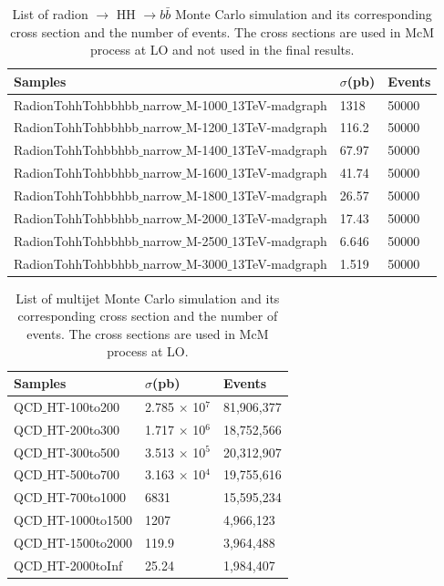 \begin{table}[h!]
  \begin{center}
    \begin{tabular}{l|l|l}
    Samples & $\sigma$(pb) & Events \\
    \hline
    RadionTohhTohbbhbb$\_$narrow$\_$M-1000$\_$13TeV-madgraph & 1318 & 50000 \\
    RadionTohhTohbbhbb$\_$narrow$\_$M-1200$\_$13TeV-madgraph & 116.2 & 50000 \\
    RadionTohhTohbbhbb$\_$narrow$\_$M-1400$\_$13TeV-madgraph & 67.97 & 50000 \\
    RadionTohhTohbbhbb$\_$narrow$\_$M-1600$\_$13TeV-madgraph & 41.74 & 50000 \\
    RadionTohhTohbbhbb$\_$narrow$\_$M-1800$\_$13TeV-madgraph & 26.57 & 50000 \\
    RadionTohhTohbbhbb$\_$narrow$\_$M-2000$\_$13TeV-madgraph & 17.43 & 50000 \\
    RadionTohhTohbbhbb$\_$narrow$\_$M-2500$\_$13TeV-madgraph & 6.646 & 50000 \\
    RadionTohhTohbbhbb$\_$narrow$\_$M-3000$\_$13TeV-madgraph & 1.519 & 50000 \\
   \hline
    \end{tabular}
  \end{center}
  \caption{List of radion $\rightarrow$ HH $\rightarrow b\bar{b} $ Monte Carlo simulation and its corresponding cross section and the number of events. The cross sections are used in McM process at LO and not used in the final results.}
\end{table} 

\begin{table}[h!]
  \begin{center}
    \begin{tabular}{l|l|l}
    Samples & $\sigma$(pb) & Events \\
    \hline
    QCD$\_$HT-100to200  & 2.785 $\times$ 10$^7$ & 81,906,377 \\
    QCD$\_$HT-200to300  & 1.717 $\times$ 10$^6$ & 18,752,566 \\
    QCD$\_$HT-300to500  & 3.513 $\times$ 10$^5$ & 20,312,907 \\
    QCD$\_$HT-500to700  & 3.163 $\times$ 10$^4$ & 19,755,616 \\
    QCD$\_$HT-700to1000  & 6831 & 15,595,234 \\
    QCD$\_$HT-1000to1500  & 1207 & 4,966,123 \\
    QCD$\_$HT-1500to2000  & 119.9 & 3,964,488 \\
    QCD$\_$HT-2000toInf  & 25.24 & 1,984,407 \\
	\hline
    \end{tabular}
  \end{center}

  \caption{List of multijet Monte Carlo simulation and its corresponding cross section and the number of events. The cross sections are used in McM process at LO.}
\end{table}

